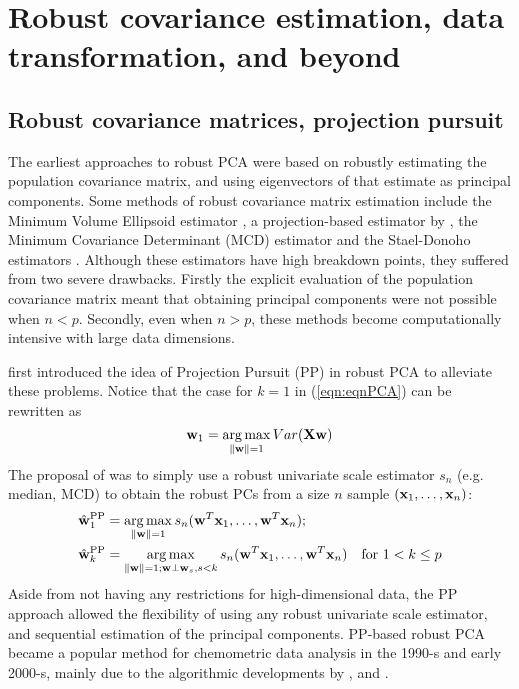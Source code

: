 \section{Robust covariance estimation, data transformation, and beyond}
\label{Section:sec2}

\subsection{Robust covariance matrices, projection pursuit}

The earliest approaches to robust PCA were based on robustly estimating the population covariance matrix, and using eigenvectors of that estimate as principal components. Some methods of robust covariance matrix estimation include the Minimum Volume Ellipsoid estimator \citep{Rousseeuw84}, a projection-based estimator by \citep{maronna76}, the Minimum Covariance Determinant (MCD) estimator \citep{rousseeuw85} and the Stael-Donoho estimators \citep{MaronnaYohai95,ZuoCui05}. Although these estimators have high breakdown points, they suffered from two severe drawbacks. Firstly the explicit evaluation of the population covariance matrix meant that obtaining principal components were not possible when $n < p$. Secondly, even when $n > p$, these methods become computationally intensive with large data dimensions.

\cite{LiChen85} first introduced the idea of Projection Pursuit (PP) in robust PCA to alleviate these problems. Notice that the case for $k=1$ in (\ref{eqn:eqnPCA}) can be rewritten as
%
$$
{\bf{w}}_1 = \operatorname*{arg\,max}_{\| {\bf{w}} \| = 1} Var ({\mathbf{X}} {\bf{w}})
$$
%
The proposal of \cite{LiChen85} was to simply use a robust univariate scale estimator $s_n$ (e.g. median, MCD) to obtain the robust PCs from a size $n$ sample $({\bf{x}}_1, \ldots, {\bf{x}}_n)$:
%
\begin{align*}
\hat {{\bf{w}}}_1^\text{PP} &= \operatorname*{arg\,max}_{\| {\bf{w}} \| = 1} s_n ( {\bf{w}}^T {\bf{x}}_1, \ldots, {\bf{w}}^T {\bf{x}}_n );\\
\hat {{\bf{w}}}_k^\text{PP} &= \operatorname*{arg\,max}_{\| {\bf{w}} \| = 1; {\bf{w}} \perp {\bf{w}}_s, s < k} s_n ( {\bf{w}}^T {\bf{x}}_1, \ldots, {\bf{w}}^T {\bf{x}}_n ) \quad \text{for } 1< k \leq p
\end{align*}
%
Aside from not having any restrictions for high-dimensional data, the PP approach allowed the flexibility of using any robust univariate scale estimator, and sequential estimation of the principal components. PP-based robust PCA became a popular method for chemometric data analysis in the 1990-s and early 2000-s, mainly due to the algorithmic developments by \cite{XieEtal93}, \cite{HubertEtal02} and \cite{CrouxEtal07}.
